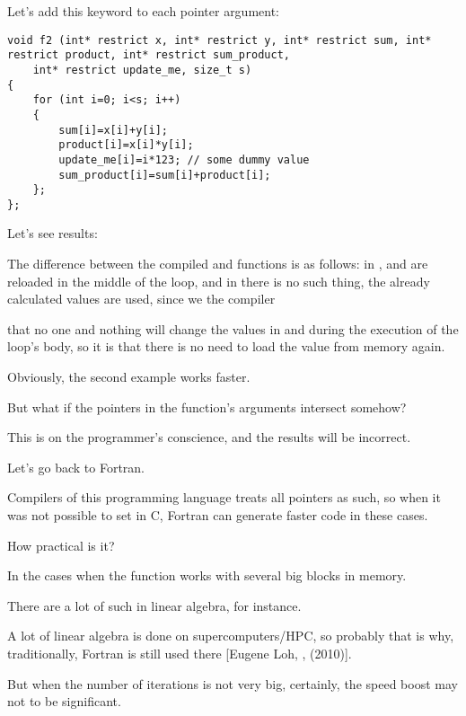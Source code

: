 Let's add this keyword to each pointer argument:

\begin{lstlisting}
void f2 (int* restrict x, int* restrict y, int* restrict sum, int* restrict product, int* restrict sum_product, 
	int* restrict update_me, size_t s)
{
	for (int i=0; i<s; i++)
	{
		sum[i]=x[i]+y[i];
		product[i]=x[i]*y[i];
		update_me[i]=i*123; // some dummy value
		sum_product[i]=sum[i]+product[i];	
	};
};
\end{lstlisting}

Let's see results:





The difference between the compiled  and  functions is as follows:
in ,  and  
are reloaded in the middle of the loop,
and in  
there is no such thing,
the already calculated values are used, 
since we  the compiler 

that no one and nothing will change the values in  
and  during the execution of the loop's body, 
so it is  that there is no need to load the value from memory again.

Obviously, the second example works faster.

But what if the pointers in the function's arguments intersect somehow?

This is on the programmer's conscience, and the results will be incorrect.

Let's go back to Fortran. 

Compilers of this programming language treats all pointers as such, 
so when it was not possible to set  in C, Fortran can generate faster code in these cases.

How practical is it? 

In the cases when the function works with several big blocks in memory.

There are a lot of such in linear algebra, for instance.

A lot of linear algebra is done on supercomputers/\ac{HPC}, so probably that is why, traditionally, Fortran is still
used there [Eugene Loh, , (2010)].

But when the number of iterations is not very big,
certainly, the speed boost may not to be significant.

